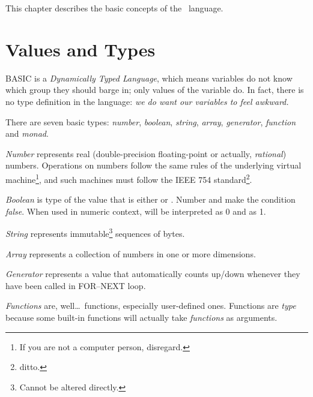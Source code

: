 \quad
{}

This chapter describes the basic concepts of the \tbas\ language.


\section{Values and Types}
\label{valuesandtypes}

BASIC is a \emph{Dynamically Typed Language}, which means variables do not know which group they should barge in; only values of the variable do. In fact, there is no type definition in the language: \emph{we do want our variables to feel awkward.}

There are seven basic types: \emph{number}, \emph{boolean}, \emph{string},  \emph{array}, \emph{generator}, \emph{function} and \emph{monad}.

\emph{Number} represents real (double-precision floating-point or actually, \emph{rational}) numbers. Operations on numbers follow the same rules of the underlying virtual machine\footnote{If you are not a computer person, disregard.}, and such machines must follow the IEEE 754 standard\footnote{ditto.}. 

\emph{Boolean} is type of the value that is either  or . Number  and  make the condition \emph{false}. When used in numeric context,  will be interpreted as 0 and  as 1.

\emph{String} represents immutable\footnote{Cannot be altered directly.} sequences of bytes.

\emph{Array} represents a collection of numbers in one or more dimensions.

\emph{Generator} represents a value that automatically counts up/down whenever they have been called in FOR--NEXT loop.

\emph{Functions} are, well\ldots\ functions, especially user-defined ones. Functions are \emph{type} because some built-in functions will actually take \emph{functions} as arguments.

